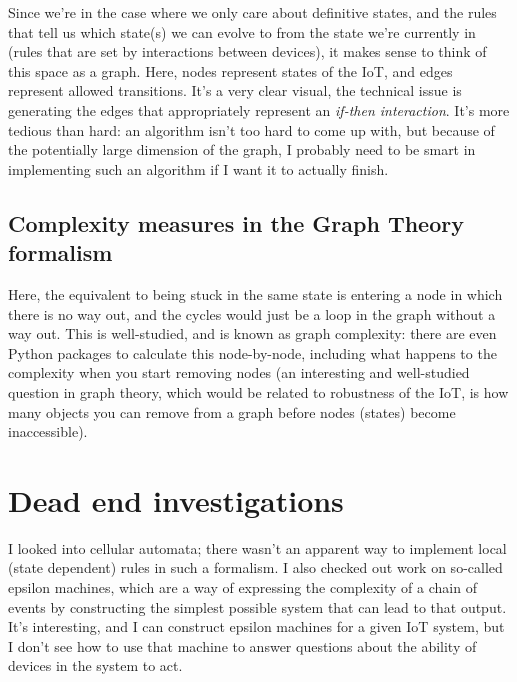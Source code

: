 \documentclass{article}
\begin{document}
Since we're in the case where we only care about definitive states, and the rules that tell us which state(s) we can evolve to from the state we're currently in (rules that are set by interactions between devices), it makes sense to think of this space as a graph. Here, nodes represent states of the IoT, and edges represent allowed transitions. It's a very clear visual, the technical issue is generating the edges that appropriately represent an \textit{if-then interaction}. It's more tedious than hard: an algorithm isn't too hard to come up with, but because of the potentially large dimension of the graph, I probably need to be smart in implementing such an algorithm if I want it to actually finish. 

\subsection{Complexity measures in the Graph Theory formalism}
Here, the equivalent to being stuck in the same state is entering a node in which there is no way out, and the cycles would just be a loop in the graph without a way out. This is well-studied, and is known as graph complexity: there are even Python packages to calculate this node-by-node, including what happens to the complexity when you start removing nodes (an interesting and well-studied question in graph theory, which would be related to robustness of the IoT, is how many objects you can remove from a graph before nodes (states) become inaccessible).

\section{Dead end investigations}
I looked into cellular automata; there wasn't an apparent way to implement local (state dependent) rules in such a formalism. I also checked out work on so-called epsilon machines, which are a way of expressing the complexity of a chain of events by constructing the simplest possible system that can lead to that output. It's interesting, and I can construct epsilon machines for a given IoT system, but I don't see how to use that machine to answer questions about the ability of devices in the system to act.
\end{document}
